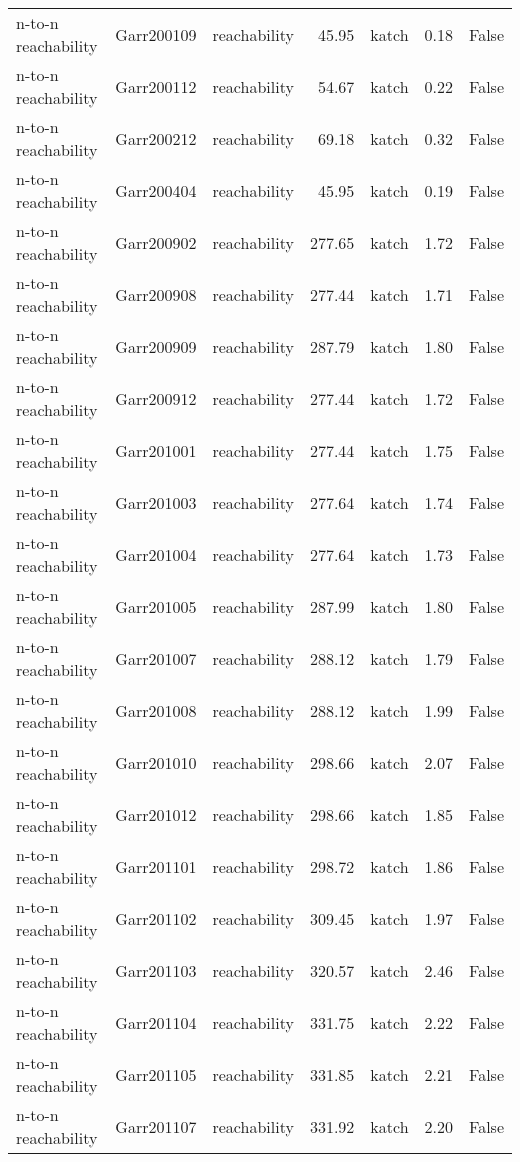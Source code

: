 \begin{tabular}{lllrlrr}
n-to-n reachability & Garr200109 & reachability & 45.95 & katch & 0.18 & False \\
n-to-n reachability & Garr200112 & reachability & 54.67 & katch & 0.22 & False \\
n-to-n reachability & Garr200212 & reachability & 69.18 & katch & 0.32 & False \\
n-to-n reachability & Garr200404 & reachability & 45.95 & katch & 0.19 & False \\
n-to-n reachability & Garr200902 & reachability & 277.65 & katch & 1.72 & False \\
n-to-n reachability & Garr200908 & reachability & 277.44 & katch & 1.71 & False \\
n-to-n reachability & Garr200909 & reachability & 287.79 & katch & 1.80 & False \\
n-to-n reachability & Garr200912 & reachability & 277.44 & katch & 1.72 & False \\
n-to-n reachability & Garr201001 & reachability & 277.44 & katch & 1.75 & False \\
n-to-n reachability & Garr201003 & reachability & 277.64 & katch & 1.74 & False \\
n-to-n reachability & Garr201004 & reachability & 277.64 & katch & 1.73 & False \\
n-to-n reachability & Garr201005 & reachability & 287.99 & katch & 1.80 & False \\
n-to-n reachability & Garr201007 & reachability & 288.12 & katch & 1.79 & False \\
n-to-n reachability & Garr201008 & reachability & 288.12 & katch & 1.99 & False \\
n-to-n reachability & Garr201010 & reachability & 298.66 & katch & 2.07 & False \\
n-to-n reachability & Garr201012 & reachability & 298.66 & katch & 1.85 & False \\
n-to-n reachability & Garr201101 & reachability & 298.72 & katch & 1.86 & False \\
n-to-n reachability & Garr201102 & reachability & 309.45 & katch & 1.97 & False \\
n-to-n reachability & Garr201103 & reachability & 320.57 & katch & 2.46 & False \\
n-to-n reachability & Garr201104 & reachability & 331.75 & katch & 2.22 & False \\
n-to-n reachability & Garr201105 & reachability & 331.85 & katch & 2.21 & False \\
n-to-n reachability & Garr201107 & reachability & 331.92 & katch & 2.20 & False \\

\end{tabular}
